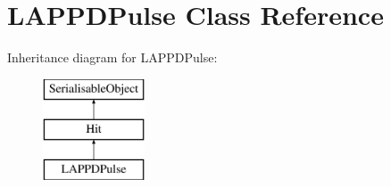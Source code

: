 \hypertarget{classLAPPDPulse}{\section{L\-A\-P\-P\-D\-Pulse Class Reference}
\label{classLAPPDPulse}
}
Inheritance diagram for L\-A\-P\-P\-D\-Pulse\-:\begin{figure}[H]
\begin{center}
\leavevmode
\includegraphics[height=3.000000cm]{classLAPPDPulse}
\end{center}
\end{figure}
